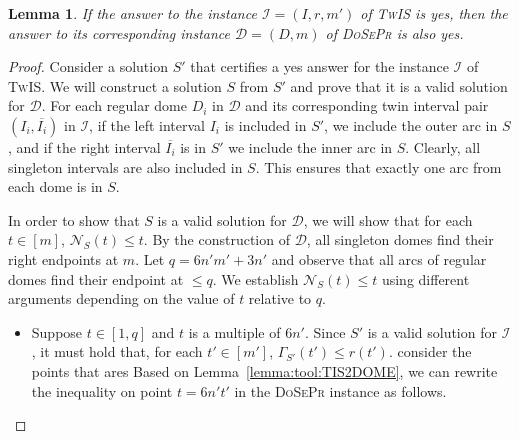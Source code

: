 \documentclass[letterpaper,11pt]{article}
\newtheorem{lemma}[theorem]{Lemma}
\newcommand{\tis}{\textsc{TwIS}\xspace}
\newcommand{\dspr}{\textsc{DoSePr}\xspace}
\begin{document}
\begin{lemma}
\label{lemma:TIS2DSPR}
If the answer to the instance $\mathcal{I}=(I,r,m')$ of \tis is yes, then the answer to its corresponding instance $\mathcal{D}=(D,m)$ of \dspr is also yes.
\end{lemma}
\begin{proof}
Consider a solution $S'$ that certifies a yes answer for the instance $\mathcal{I}$ of \tis. We will construct a solution $S$ from $S'$ and prove that it is a valid solution for $\mathcal{D}$. For each regular dome $D_i$ in $\mathcal{D}$ and its corresponding twin interval pair $(I_i,\overline{I_i})$ in $\mathcal{I}$, if the left interval $I_i$ is included in $S'$, we include the outer arc in $S$, and if the right interval $\overline{I_i}$ is in $S'$ we include the inner arc in $S$. Clearly, all singleton intervals are also included in $S$. This ensures that exactly one arc from each dome is in $S$. 

In order to show that $S$ is a valid solution for $\mathcal{D}$, we will show that for each $t\in [m]$, $\mathcal{N}_{S}(t) \leq t$. By the construction of $\mathcal{D}$, all singleton domes find their right endpoints at $m$. Let $q=6n'm'+3n'$ and observe that all arcs of regular domes find their endpoint at $\leq q$. We establish $\mathcal{N}_{S}(t) \leq t$ using different arguments depending on the value of $t$ relative to $q$.
\begin{itemize}

\item Suppose $t \in [1,q]$ and $t$ is a multiple of $6n'$. Since $S'$ is a valid solution for $\mathcal{I}$, it must hold that, for each $t'\in[m']$, $\Gamma_{S'}(t')\leq r(t')$.
consider the points that ares Based on Lemma~\ref{lemma:tool:TIS2DOME}, we can rewrite the inequality on point $t = 6n't'$ in the \dspr instance as follows.






\end{itemize}
\end{proof}
\end{document}
